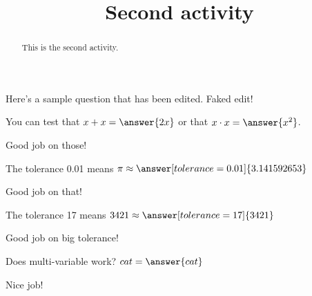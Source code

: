 \documentclass[handout]{ximera}
\title{Second activity}
\begin{document}
\begin{abstract}
This is the second activity.
\end{abstract}


\maketitle

Here's a sample question that has been edited. Faked edit!

\begin{problem}
\begin{multipleChoice}
\end{multipleChoice}
\begin{problem}
   You can test that $x + x = \answer{2x}$ or that $x \cdot x = \answer{x^2}$.
\begin{feedback}Good job on those!\end{feedback}

\begin{problem}
   The tolerance 0.01 means $\pi \approx \answer[tolerance=0.01]{3.141592653}$
\begin{feedback}Good job on that!\end{feedback}

\begin{problem}
   The tolerance 17 means $3421 \approx \answer[tolerance=17]{3421}$
\begin{feedback}Good job on big tolerance!\end{feedback}

\begin{problem}
Does multi-variable work? $ cat = \answer{cat}$
\begin{feedback}Nice job!\end{feedback}
\end{problem}
\end{problem}
\end{problem}
\end{problem}
\end{problem}
\end{document}
